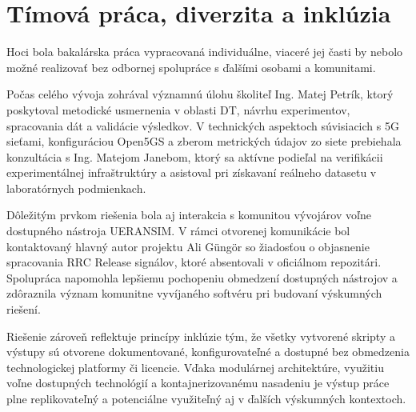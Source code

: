 \section{Tímová práca, diverzita a inklúzia}

Hoci bola bakalárska práca vypracovaná individuálne, viaceré jej časti by nebolo možné realizovať bez odbornej spolupráce s ďalšími osobami a komunitami.

Počas celého vývoja zohrával významnú úlohu školiteľ Ing. Matej Petrík, ktorý poskytoval metodické usmernenia v oblasti DT, návrhu experimentov, spracovania dát a validácie výsledkov. V technických aspektoch súvisiacich s 5G sieťami, konfiguráciou Open5GS a zberom metrických údajov zo siete prebiehala konzultácia s Ing. Matejom Janebom, ktorý sa aktívne podieľal na verifikácii experimentálnej infraštruktúry a asistoval pri získavaní reálneho datasetu v laboratórnych podmienkach.

Dôležitým prvkom riešenia bola aj interakcia s komunitou vývojárov voľne dostupného nástroja UERANSIM. V rámci otvorenej komunikácie bol kontaktovaný hlavný autor projektu Ali Güngör so žiadosťou o objasnenie spracovania RRC Release signálov, ktoré absentovali v oficiálnom repozitári. Spolupráca napomohla lepšiemu pochopeniu obmedzení dostupných nástrojov a zdôraznila význam komunitne vyvíjaného softvéru pri budovaní výskumných riešení.

Riešenie zároveň reflektuje princípy inklúzie tým, že všetky vytvorené skripty a výstupy sú otvorene dokumentované, konfigurovateľné a dostupné bez obmedzenia technologickej platformy či licencie. Vďaka modulárnej architektúre, využitiu voľne dostupných technológií a kontajnerizovanému nasadeniu je výstup práce plne replikovateľný a potenciálne využiteľný aj v ďalších výskumných kontextoch.